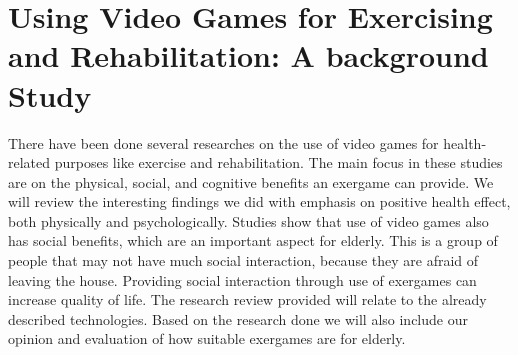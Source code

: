 \section{Using Video Games for Exercising and Rehabilitation: A background Study}
There have been done several researches on the use of video games for health-related purposes like exercise and rehabilitation. The main focus in these studies are on the physical, social, and cognitive benefits an exergame can provide. We will review the interesting findings we did with emphasis on positive health effect, both physically and psychologically. Studies show that use of video games also has social benefits, which are an important aspect for elderly. This is a group of people that may not have much social interaction, because they are afraid of leaving the house. Providing social interaction through use of exergames can increase quality of life. The research review provided will relate to the already described technologies. Based on the research done we will also include our opinion and evaluation of how suitable exergames are for elderly. \\ \\
